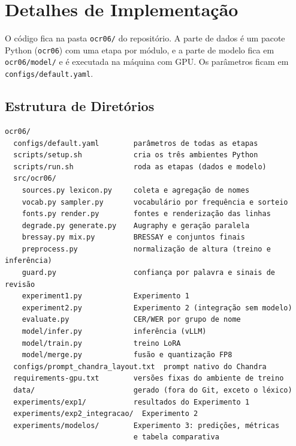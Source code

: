 \documentclass[12pt,a4paper]{article}
\begin{document}
\nocite{*}
\printbibliography

\appendix

\section{Detalhes de Implementação}
\label{app:implementacao}

O código fica na pasta \texttt{ocr06/} do repositório. A parte de dados é um pacote Python (\texttt{ocr06}) com uma etapa por módulo, e a parte de modelo fica em \texttt{ocr06/model/} e é executada na máquina com GPU. Os parâmetros ficam em \texttt{configs/default.yaml}.

\subsection{Estrutura de Diretórios}

{\small
\begin{verbatim}
ocr06/
  configs/default.yaml        parâmetros de todas as etapas
  scripts/setup.sh            cria os três ambientes Python
  scripts/run.sh              roda as etapas (dados e modelo)
  src/ocr06/
    sources.py lexicon.py     coleta e agregação de nomes
    vocab.py sampler.py       vocabulário por frequência e sorteio
    fonts.py render.py        fontes e renderização das linhas
    degrade.py generate.py    Augraphy e geração paralela
    bressay.py mix.py         BRESSAY e conjuntos finais
    preprocess.py             normalização de altura (treino e inferência)
    guard.py                  confiança por palavra e sinais de revisão
    experiment1.py            Experimento 1
    experiment2.py            Experimento 2 (integração sem modelo)
    evaluate.py               CER/WER por grupo de nome
    model/infer.py            inferência (vLLM)
    model/train.py            treino LoRA
    model/merge.py            fusão e quantização FP8
  configs/prompt_chandra_layout.txt  prompt nativo do Chandra
  requirements-gpu.txt        versões fixas do ambiente de treino
  data/                       gerado (fora do Git, exceto o léxico)
  experiments/exp1/           resultados do Experimento 1
  experiments/exp2_integracao/  Experimento 2
  experiments/modelos/        Experimento 3: predições, métricas
                              e tabela comparativa
\end{verbatim}
}
\end{document}
